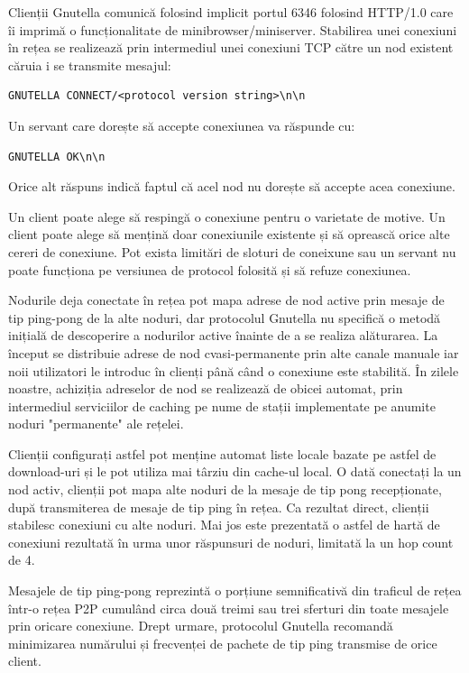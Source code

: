 Clienții Gnutella comunică folosind implicit portul 6346 folosind HTTP/1.0
care îi imprimă o funcționalitate de minibrowser/miniserver. Stabilirea unei
conexiuni în rețea se realizează prin intermediul unei conexiuni TCP către un
nod existent căruia i se transmite mesajul:

\begin{verbatim}
GNUTELLA CONNECT/<protocol version string>\n\n
\end{verbatim}

Un servant care dorește să accepte conexiunea va răspunde cu:
\begin{verbatim}
GNUTELLA OK\n\n
\end{verbatim}

Orice alt răspuns indică faptul că acel nod nu dorește să accepte acea
conexiune.

Un client poate alege să respingă o conexiune pentru o varietate de motive. Un
client poate alege să mențină doar conexiunile existente și să oprească orice
alte cereri de conexiune. Pot exista limitări de sloturi de coneixune sau un
servant nu poate funcționa pe versiunea de protocol folosită și să refuze
conexiunea.

Nodurile deja conectate în rețea pot mapa adrese de nod active prin mesaje de
tip ping-pong de la alte noduri, dar protocolul Gnutella nu specifică o metodă
inițială de descoperire a nodurilor active înainte de a se realiza alăturarea.
La început se distribuie adrese de nod cvasi-permanente prin alte canale
manuale iar noii utilizatori le introduc în clienți până când o conexiune este
stabilită. În zilele noastre, achiziția adreselor de nod se realizează de
obicei automat, prin intermediul serviciilor de caching pe nume de stații
implementate pe anumite noduri "permanente" ale rețelei.

Clienții configurați astfel pot menține automat liste locale bazate pe astfel
de download-uri și le pot utiliza mai târziu din cache-ul local. O dată
conectați la un nod activ, clienții pot mapa alte noduri de la mesaje de tip
pong recepționate, după transmiterea de mesaje de tip ping în rețea. Ca
rezultat direct, clienții stabilesc conexiuni cu alte noduri. Mai jos este
prezentată o astfel de hartă de conexiuni rezultată în urma unor răspunsuri de
noduri, limitată la un hop count de 4.

Mesajele de tip ping-pong reprezintă o porțiune semnificativă din traficul de
rețea într-o rețea P2P cumulând circa două treimi sau trei sferturi din toate
mesajele prin oricare conexiune. Drept urmare, protocolul Gnutella recomandă
minimizarea numărului și frecvenței de pachete de tip ping transmise de orice
client.

